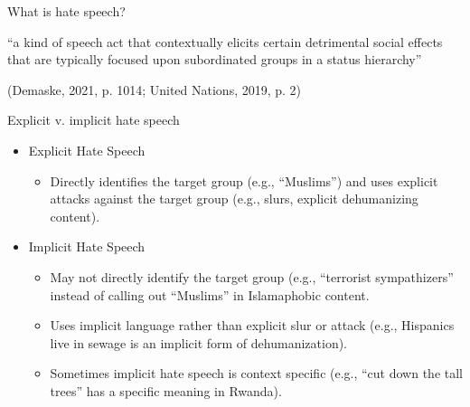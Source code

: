 \documentclass[nobackground,dvipsnames,table]{beamer}
\begin{document}
\begin{frame}{What is hate speech?}

“a kind of speech act that contextually elicits certain detrimental social effects that are typically focused upon subordinated groups in a status hierarchy” \newline 

\scriptsize{(Demaske, 2021, p. 1014; United Nations, 2019, p. 2)}


\end{frame}

\begin{frame}{Explicit v. implicit hate speech}

\begin{itemize}
    \item Explicit Hate Speech 
\begin{itemize}
    \item Directly identifies the target group (e.g., “Muslims”) and uses explicit attacks against the target group (e.g., slurs, explicit dehumanizing content). 
\end{itemize}
\item Implicit Hate Speech 
\begin{itemize}
    \item May not directly identify the target group (e.g., “terrorist sympathizers” instead of calling out “Muslims” in Islamaphobic content. 
\item Uses implicit language rather than explicit slur or attack (e.g., Hispanics live in sewage is an implicit form of dehumanization). 
\item Sometimes implicit hate speech is context specific (e.g., “cut down the tall trees” has a specific meaning in Rwanda).
\end{itemize}
\end{itemize}
\end{frame}
\end{document}
